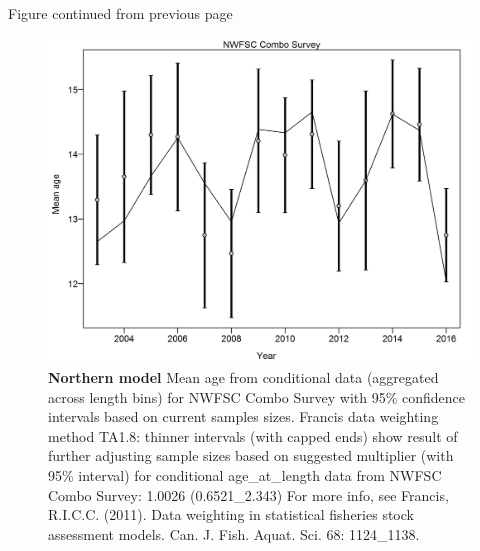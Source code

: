 \documentclass[12pt,]{article}
\begin{document}
\begin{center} 

            Figure continued from previous page 

            \end{center}

\begin{figure}[htbp]
\centering
\includegraphics{./tex2pdf.8516/08a726e4569979fe9bebdbe767438bd327c5f90f.png}
\caption{\textbf{Northern model} Mean age from conditional data
(aggregated across length bins) for NWFSC Combo Survey with 95\%
confidence intervals based on current samples sizes. Francis data
weighting method TA1.8: thinner intervals (with capped ends) show result
of further adjusting sample sizes based on suggested multiplier (with
95\% interval) for conditional age\_at\_length data from NWFSC Combo
Survey: 1.0026 (0.6521\_2.343) For more info, see Francis, R.I.C.C.
(2011). Data weighting in statistical fisheries stock assessment models.
Can. J. Fish. Aquat. Sci. 68: 1124\_1138.
\label{fig:mod1_3_comp_condAALfit_data_weighting_TA1.8_condAgeNWFSC Combo Survey}}
\end{figure}
\end{document}
